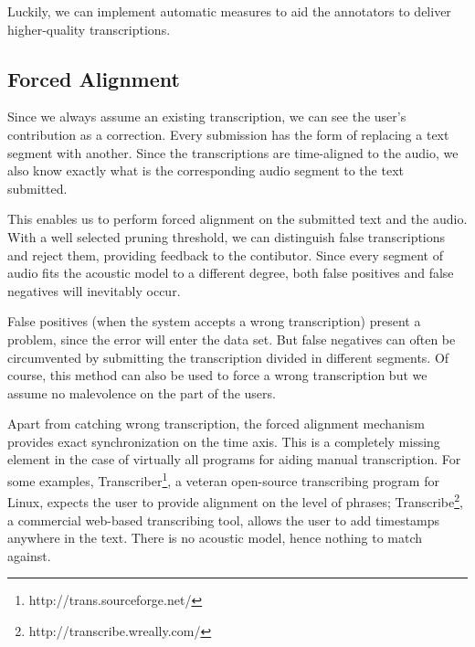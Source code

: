 \documentclass{itatnew}
\begin{document}
Luckily, we can implement automatic measures to aid the annotators to deliver
higher-quality transcriptions.

\subsection{Forced Alignment}

Since we always assume an existing transcription, we can see the user's
contribution as a correction. Every submission has
the form of replacing a text segment with another. Since the transcriptions are
time-aligned to the audio, we also know exactly what is the corresponding audio
segment to the text submitted.

This enables us to perform forced alignment on the submitted text and the audio.
With a well selected pruning threshold, we can distinguish false transcriptions
and reject them, providing feedback to the contibutor.
Since every segment of audio fits the acoustic model to a different degree, both
false positives and false negatives will inevitably occur.

False positives (when the system accepts a wrong transcription) present a
problem, since the error will enter the data set. But false negatives can often
be circumvented by submitting the transcription divided in different segments.
Of course, this method can also be used to force a wrong transcription but we
assume no malevolence on the part of the users.

Apart from catching wrong transcription, the forced alignment mechanism provides
exact synchronization on the time axis. This is a completely missing element in
the case of virtually all programs for aiding manual transcription. For some
examples, Transcriber\footnote{http://trans.sourceforge.net/}, a veteran
open-source transcribing program for Linux, expects the user to provide
alignment on the level of phrases;
Transcribe\footnote{http://transcribe.wreally.com/}, a commercial web-based
transcribing tool, allows the user to add timestamps anywhere in the text. There
is no acoustic model, hence nothing to match against.
\end{document}
